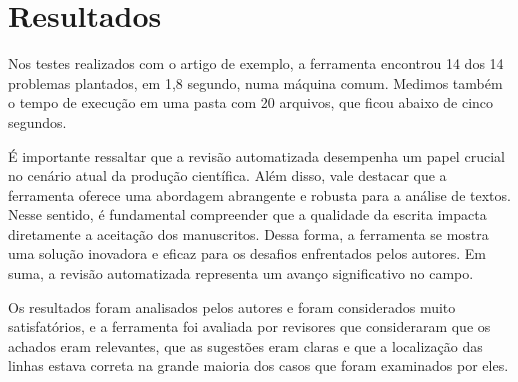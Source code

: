 \section{Resultados}\label{sec:resultados}

Nos testes realizados com o artigo de exemplo, a ferramenta encontrou 14 dos 14
problemas plantados, em 1,8 segundo, numa máquina comum. Medimos também o tempo
de execução em uma pasta com 20 arquivos, que ficou abaixo de cinco segundos.

É importante ressaltar que a revisão automatizada desempenha um papel crucial no
cenário atual da produção científica. Além disso, vale destacar que a
ferramenta oferece uma abordagem abrangente e robusta para a análise de textos.
Nesse sentido, é fundamental compreender que a qualidade da escrita impacta
diretamente a aceitação dos manuscritos. Dessa forma, a ferramenta se mostra
uma solução inovadora e eficaz para os desafios enfrentados pelos autores.
Em suma, a revisão automatizada representa um avanço significativo no campo.

Os resultados foram analisados pelos autores e foram considerados muito
satisfatórios, e a ferramenta foi avaliada por revisores que consideraram que os
achados eram relevantes, que as sugestões eram claras e que a localização das
linhas estava correta na grande maioria dos casos que foram examinados por eles.
